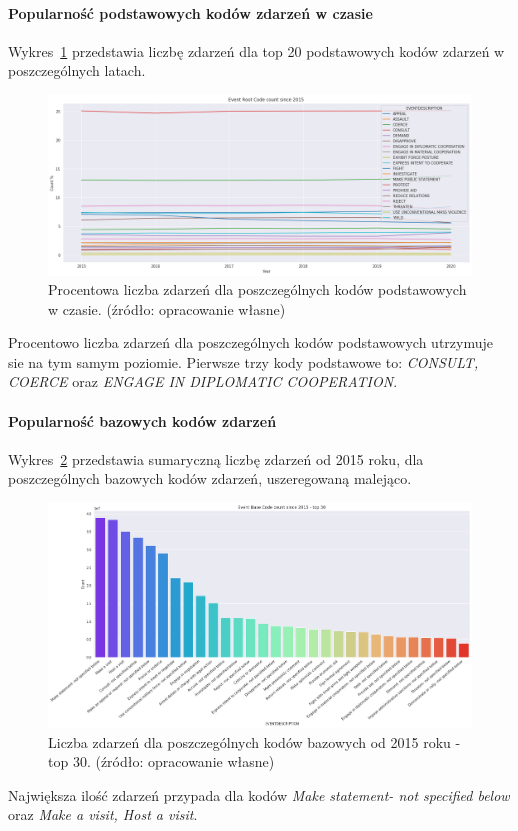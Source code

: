 \documentclass[11pt]{report}
\begin{document}
    \paragraph{Popularność podstawowych kodów zdarzeń w czasie}
    Wykres~\ref{fig:GLOBALERCperc} przedstawia liczbę zdarzeń dla top 20 podstawowych kodów zdarzeń w poszczególnych latach.
    \begin{figure}[!htp]
        \centering
        \includegraphics[width=\linewidth]{fig/GLOBAL/ERCperc.png}
        \caption{Procentowa liczba zdarzeń dla poszczególnych kodów podstawowych w czasie. (źródło: opracowanie własne)}
        \label{fig:GLOBALERCperc}
    \end{figure}
    Procentowo liczba zdarzeń dla poszczególnych kodów podstawowych utrzymuje sie na tym samym poziomie.
    Pierwsze trzy kody podstawowe to: \textit{CONSULT, COERCE} oraz \textit{ENGAGE IN DIPLOMATIC COOPERATION}.

    \paragraph{Popularność bazowych kodów zdarzeń}
    Wykres~\ref{fig:GLOBALEBC} przedstawia sumaryczną liczbę zdarzeń od 2015 roku, dla poszczególnych bazowych kodów zdarzeń, uszeregowaną malejąco.
    \begin{figure}[!htp]
        \centering
        \includegraphics[width=\linewidth]{fig/GLOBAL/EBC.png}
        \caption{Liczba zdarzeń dla poszczególnych kodów bazowych od 2015 roku - top 30. (źródło: opracowanie własne)}
        \label{fig:GLOBALEBC}
    \end{figure}
    Największa ilość zdarzeń przypada dla kodów \textit{Make statement- not specified below} oraz \textit{Make a visit, Host a visit}.
\end{document}
